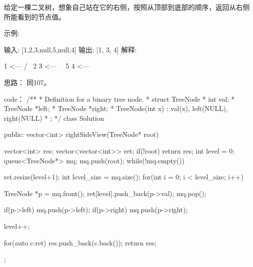 给定一棵二叉树，想象自己站在它的右侧，按照从顶部到底部的顺序，返回从右侧所能看到的节点值。

示例:

输入: [1,2,3,null,5,null,4]
输出: [1, 3, 4]
解释:

   1            <---
 /   \
2     3         <---
 \     \
  5     4       <---

























思路：
同107。
























code：
/**
 * Definition for a binary tree node.
 * struct TreeNode {
 *     int val;
 *     TreeNode *left;
 *     TreeNode *right;
 *     TreeNode(int x) : val(x), left(NULL), right(NULL) {}
 * };
 */
class Solution {
public:
    vector<int> rightSideView(TreeNode* root) {
        vector<int> res;
        vector<vector<int>> ret;
        if(!root) return res;
        int level = 0;
        queue<TreeNode*> mq;
        mq.push(root);
        while(!mq.empty())
        {
            ret.resize(level+1);
            int level_size = mq.size();
            for(int i = 0; i < level_size; i++)
            {
                TreeNode *p = mq.front();
                ret[level].push_back(p->val);
                mq.pop();
                
                if(p->left) mq.push(p->left);
                if(p->right) mq.push(p->right);
            }
            level++;
        }
        for(auto c:ret) res.push_back(c.back());
        return res;
    }
};